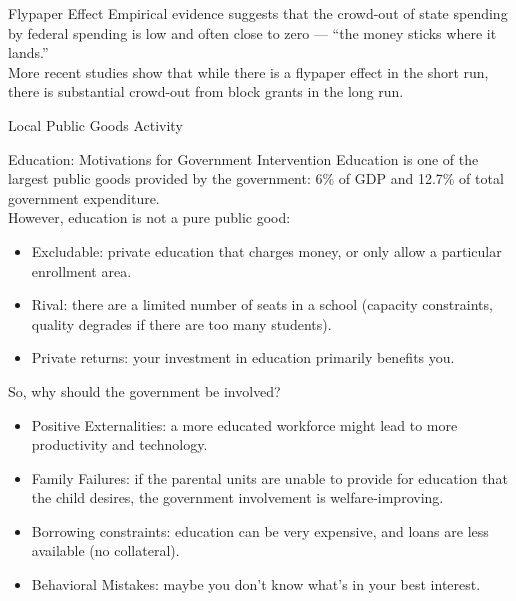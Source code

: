 \documentclass[10pt]{extarticle}
\begin{document}
  \begin{problem}{Flypaper Effect}
    Empirical evidence suggests that the crowd-out of state spending by federal spending is low and often close to zero --- ``the money sticks where it lands.''\\

    More recent studies show that while there is a flypaper effect in the short run, there is substantial crowd-out from block grants in the long run.
  \end{problem}
  \begin{problem}{Local Public Goods Activity}
    \begin{tcbraster}[raster columns = 1,colframe = black!75!white,colback=white]
    \end{tcbraster}
  \end{problem}
  \begin{problem}{Education: Motivations for Government Intervention}
    Education is one of the largest public goods provided by the government: 6\% of GDP and 12.7\% of total government expenditure.\\

    However, education is not a pure public good:
    \begin{itemize}
      \item Excludable: private education that charges money, or only allow a particular enrollment area.
      \item Rival: there are a limited number of seats in a school (capacity constraints, quality degrades if there are too many students).
      \item Private returns: your investment in education primarily benefits you.
    \end{itemize}
    So, why should the government be involved?
    \begin{itemize}
      \item Positive Externalities: a more educated workforce might lead to more productivity and technology.
      \item Family Failures: if the parental units are unable to provide for education that the child desires, the government involvement is welfare-improving.
      \item Borrowing constraints: education can be very expensive, and loans are less available (no collateral).
      \item Behavioral Mistakes: maybe you don't know what's in your best interest.
    \end{itemize}
  \end{problem}
\end{document}
